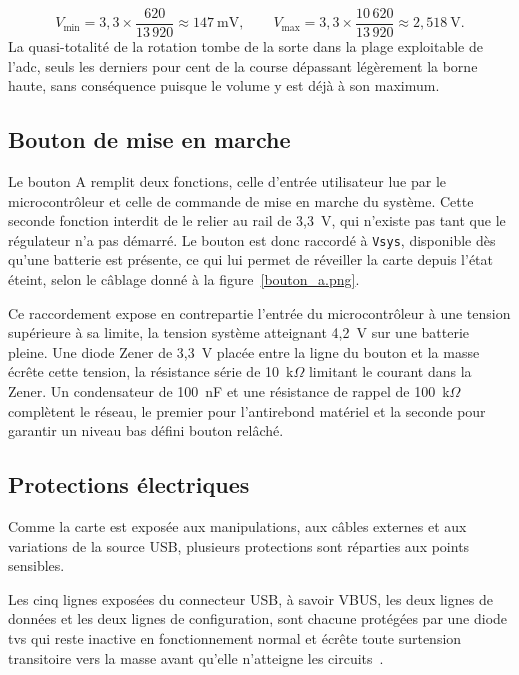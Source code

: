 \begin{equation}
  V_{\text{min}} = 3{,}3 \times \frac{620}{13\,920} \approx 147~\text{mV},
  \qquad
  V_{\text{max}} = 3{,}3 \times \frac{10\,620}{13\,920} \approx 2{,}518~\text{V}.
\end{equation}
La quasi-totalité de la rotation tombe de la sorte dans la plage exploitable de l'\gls{adc}, seuls les derniers pour cent de la course dépassant légèrement la borne haute, sans conséquence puisque le volume y est déjà à son maximum.

\subsection{Bouton de mise en marche}

Le bouton A remplit deux fonctions, celle d'entrée utilisateur lue par le microcontrôleur et celle de commande de mise en marche du système. Cette seconde fonction interdit de le relier au rail de 3,3~V, qui n'existe pas tant que le régulateur n'a pas démarré. Le bouton est donc raccordé à \texttt{Vsys}, disponible dès qu'une batterie est présente, ce qui lui permet de réveiller la carte depuis l'état éteint, selon le câblage donné à la figure~\ref{bouton_a.png}.

Ce raccordement expose en contrepartie l'entrée du microcontrôleur à une tension supérieure à sa limite, la tension système atteignant 4,2~V sur une batterie pleine. Une diode Zener de 3,3~V placée entre la ligne du bouton et la masse écrête cette tension, la résistance série de 10~k$\Omega$ limitant le courant dans la Zener. Un condensateur de 100~nF et une résistance de rappel de 100~k$\Omega$ complètent le réseau, le premier pour l'antirebond matériel et la seconde pour garantir un niveau bas défini bouton relâché.



\subsection{Protections électriques}

Comme la carte est exposée aux manipulations, aux câbles externes et aux variations de la source USB, plusieurs protections sont réparties aux points sensibles.

Les cinq lignes exposées du connecteur USB, à savoir VBUS, les deux lignes de données et les deux lignes de configuration, sont chacune protégées par une diode \gls{tvs} qui reste inactive en fonctionnement normal et écrête toute surtension transitoire vers la masse avant qu'elle n'atteigne les circuits~\cite{texas_instruments_system-level_2025}.

